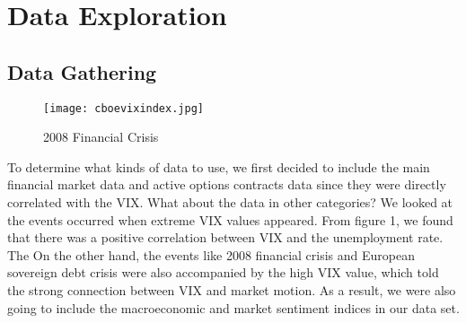 \documentclass[fleqn,10pt]{SelfArx} %
\begin{document}
\flushbottom %

\maketitle %

\tableofcontents %

\thispagestyle{empty} %



\section{Data Exploration} %

\subsection{Data Gathering}

\begin{figure*}[ht]\centering %
\texttt{[image: cboevixindex.jpg]}
\caption{2008 Financial Crisis \cite{ref3}}
\label{fig:view}
\end{figure*}

To determine what kinds of data to use, we first decided to include the main financial market data and active options contracts data since they were directly correlated with the VIX. What about the data in other categories? We looked at the events occurred when extreme VIX values appeared. From figure 1, we found that there was a positive correlation between VIX and the unemployment rate. The On the other hand, the events like 2008 financial crisis and European sovereign debt crisis were also accompanied by the high VIX value, which told the strong connection between VIX and market motion. As a result, we were also going to include the macroeconomic and market sentiment indices in our data set.\\
\end{document}
